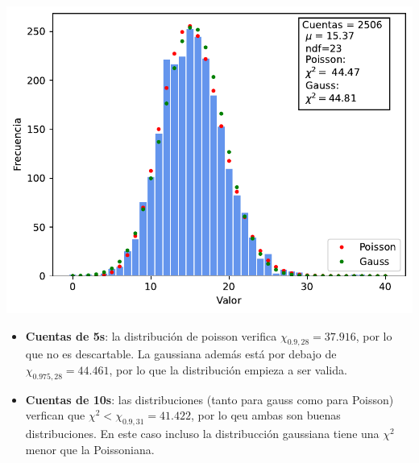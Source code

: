 \documentclass[11pt]{article}
\begin{document}
\begin{minipage}[t]{0.5\linewidth}
\begin{center} 
	\label{Fig:2s}
	\includegraphics[width=1\linewidth]{../Graficas/Histo_2s.pdf}
\end{center}
\end{minipage}	

\begin{itemize}
	\item \textbf{Cuentas de 5s}: la distribución de poisson verifica $\chi_{0.9,28}=37.916$, por lo que no es descartable. La gaussiana además está por debajo de $\chi_{0.975,28}=44.461$, por lo que la distribución empieza a ser valida. 
	\item \textbf{Cuentas de 10s}: las distribuciones (tanto para gauss como para Poisson) verfican que $\chi^2<\chi_{0.9,31}=41.422$, por lo qeu ambas son buenas distribuciones. En este caso incluso la distribucción gaussiana tiene una $\chi^2$ menor que la Poissoniana. 
\end{itemize}
\end{document}
